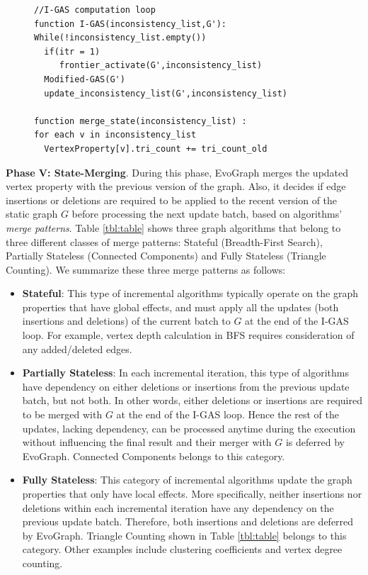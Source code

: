 \begin{figure}[!htb]
\begin{minipage}{0.5\columnwidth}
\begin{lstlisting}[caption=\textbf{Triangle Count in EvoGraph.}, captionpos='b',label={lst:mm_tc}, basicstyle={\tiny\sffamily\bfseries},numberstyle=\tiny]
//I-GAS computation loop
function I-GAS(inconsistency_list,G'):
While(!inconsistency_list.empty())
  if(itr = 1)
     frontier_activate(G',inconsistency_list)
  Modified-GAS(G')
  update_inconsistency_list(G',inconsistency_list) 

function merge_state(inconsistency_list) :
for each v in inconsistency_list
  VertexProperty[v].tri_count += tri_count_old

\end{lstlisting}
\end{minipage}
\vspace{-0.5cm}
\end{figure}
\fi


\textbf{Phase V: State-Merging}. During this phase, EvoGraph merges the updated vertex property with the previous version of the graph. Also, it decides if edge insertions or deletions are required to be applied to the recent version of the static graph $G$ before processing the next update batch, based on algorithms' \textit{merge patterns}. Table \ref{tbl:table} shows three graph algorithms that belong to three different classes of merge patterns: Stateful (Breadth-First Search), Partially Stateless (Connected Components) and Fully Stateless (Triangle Counting). We summarize these three merge patterns as follows:

\begin{itemize}
\item \textbf{Stateful}: This type of incremental algorithms typically operate on the graph properties that have global effects, and must apply all the updates (both insertions and deletions) of the current batch to $G$ at the end of the I-GAS loop. For example, vertex depth calculation in BFS requires consideration of any added/deleted edges. 
\item \textbf{Partially Stateless}: In each incremental iteration, this type of algorithms have dependency on either deletions or insertions from the previous update batch, but not both. In other words, either deletions or insertions are required to be merged with $G$ at the end of the I-GAS loop. Hence the rest of the updates, lacking dependency,  can be processed anytime during the execution without influencing the final result and their merger with $G$ is deferred by EvoGraph. Connected Components belongs to this category. 
\item \textbf{Fully Stateless}: This category of incremental algorithms update the graph properties that only have local effects. More specifically, neither insertions nor deletions within each incremental iteration have any dependency on the previous update batch. Therefore, both insertions and deletions are deferred by EvoGraph. Triangle Counting shown in Table \ref{tbl:table} belongs to this category. Other examples include clustering coefficients and vertex degree counting.
\end{itemize}
    

